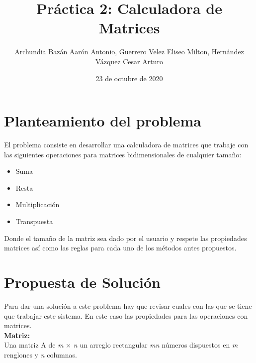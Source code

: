 \documentclass[letter]{revtex4}
\begin{document}
\title{Práctica 2: Calculadora de Matrices}
\author{Archundia Bazán Aarón Antonio, Guerrero Velez Eliseo Milton, Hernández Vázquez Cesar Arturo}

\date{23 de octubre de 2020}
\maketitle


\section{Planteamiento del problema}

El problema consiste en desarrollar una calculadora de matrices que trabaje con las siguientes operaciones para matrices bidimensionales de cualquier tamaño: 
\begin{itemize}
    \item Suma
    \item Resta
    \item Multiplicación
    \item Transpuesta
\end{itemize}
Donde el tamaño de la matriz sea dado por el usuario y respete las propiedades matrices así como las reglas para cada uno de los métodos antes propuestos.

\section{Propuesta de Solución}
Para dar una solución a este problema hay que revisar cuales con las que se tiene que trabajar este sistema. En este caso las propiedades para las operaciones con  matrices.  \\ 
  \textbf{Matriz:} \\
  Una matriz A de \emph{m} $\times$ \emph{n}  un arreglo rectangular \emph{mn} números dispuestos en \emph{m} renglones y \emph{n} columnas.
  
\end{document}
